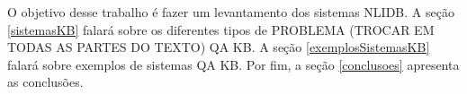 \documentclass{article}
\begin{document}
O objetivo desse trabalho é fazer um levantamento dos sistemas NLIDB. A seção \ref{sistemasKB} falará sobre os diferentes tipos de PROBLEMA (TROCAR EM TODAS AS PARTES DO TEXTO) QA KB. A seção \ref{exemplosSistemasKB} falará sobre exemplos de sistemas QA KB. Por fim, a seção \ref{conclusoes} apresenta as conclusões.











\end{document}
